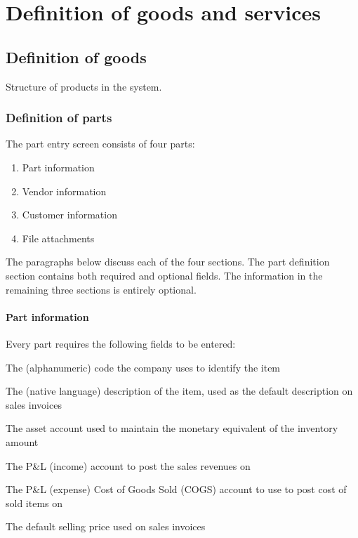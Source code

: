 \chapter{Definition of goods and services}
\label{cha-products-definition}


\section{Definition of goods}
\label{sec-products-definition-goods}

Structure of products in the system.

\subsection{Definition of parts}
\label{subsec-products-parts-definition}

The part entry screen consists of four parts:

\begin{enumerate}
\item Part information
\item Vendor information
\item Customer information
\item File attachments
\end{enumerate}


The paragraphs below discuss each of the four sections. The part definition section
contains both required and optional fields. The information in the remaining
three sections is entirely optional.

\subsubsection{Part information}
\label{subsubsec-parts-information}

Every part requires the following fields to be entered:

\begin{description}[style=nextline]
\item [Number] The (alphanumeric) code the company uses to identify the item
\item [Description] The (native language) description of the item, used as the default
        description on sales invoices
\item [Inventory account] The asset account used to maintain the monetary equivalent
        of the inventory amount
\item [Income account] The P\&L (income) account to post the sales revenues on
\item [COGS account] The P\&L (expense) Cost of Goods Sold (COGS) account to use
        to post cost of sold items on
\item [Sell price] The default selling price used on sales invoices
\end{description}


